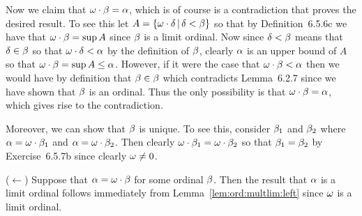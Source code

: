 {{    Now we claim that $\omega \cdot \beta = \alpha$, which is of course is a contradiction that proves the desired result.
    To see this let $A = \left\{ \omega \cdot \delta \,|\, \delta < \beta \right\}$ so that by Definition~6.5.6c we have that $\omega \cdot \beta = \sup{A}$ since $\beta$ is a limit ordinal.
    Now since $\delta < \beta$ means that $\delta \in \beta$ so that $\omega \cdot \delta < \alpha$ by the definition of $\beta$, clearly $\alpha$ is an upper bound of $A$ so that $\omega \cdot \beta = \sup{A} \leq \alpha$.
    However, if it were the case that $\omega \cdot \beta < \alpha$ then we would have by definition that $\beta \in \beta$ which contradicts Lemma~6.2.7 since we have shown that $\beta$ is an ordinal.
    Thus the only possibility is that $\omega \cdot \beta = \alpha$, which gives rise to the contradiction.

    Moreover, we can show that $\beta$ is unique.
    To see this, consider $\beta_1$ and $\beta_2$ where $\alpha = \omega \cdot \beta_1$ and $\alpha = \omega \cdot \beta_2$.
    Then clearly $\omega \cdot \beta_1 = \omega \cdot \beta_2$ so that $\beta_1 = \beta_2$ by Exercise~6.5.7b since clearly $\omega \neq 0$.

    ($\leftarrow$) Suppose that $\alpha = \omega \cdot \beta$ for some ordinal $\beta$.
    Then the result that $\alpha$ is a limit ordinal follows immediately from Lemma~\ref{lem:ord:multlim:left} since $\omega$ is a limit ordinal.
  }
}

